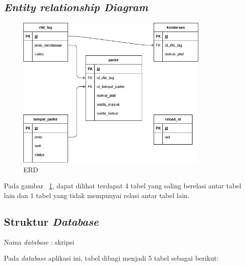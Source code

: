 \subsection{\textit{Entity relationship Diagram}}
\begin{figure} [H]
    \includegraphics[width=0.85\textwidth, center]{images/er diagram.png}
    \caption{ERD}
    \label{fig:erd}
\end{figure}

Pada gambar ~\ref{fig:erd}, dapat dilihat terdapat 4 tabel yang saling berelasi antar tabel lain dan 1 tabel yang tidak mempunyai relasi antar tabel lain.

\subsection{Struktur \textit{Database}}
Nama \textit{database} : skripsi

Pada \textit{database} aplikasi ini, tabel dibagi menjadi 5 tabel sebagai berikut:


